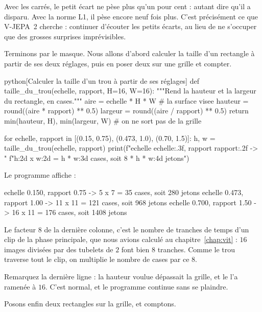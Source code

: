 Avec les carrés, le petit écart ne pèse plus qu'un pour cent : autant dire
qu'il a disparu. Avec la norme L1, il pèse encore neuf fois plus. C'est
précisément ce que V-JEPA~2 cherche : continuer d'écouter les petits écarts,
au lieu de ne s'occuper que des grosses surprises imprévisibles.

Terminons par le masque. Nous allons d'abord calculer la taille d'un
rectangle à partir de ses deux réglages, puis en poser deux sur une grille
et compter.

\begin{code}{python}[Calculer la taille d'un trou à partir de ses réglages]
def taille_du_trou(echelle, rapport, H=16, W=16):
    """Rend la hauteur et la largeur du rectangle, en cases."""
    aire = echelle * H * W                       # la surface visee
    hauteur = round((aire * rapport) ** 0.5)
    largeur = round((aire / rapport) ** 0.5)
    return min(hauteur, H), min(largeur, W)      # on ne sort pas de la grille

for echelle, rapport in [(0.15, 0.75), (0.473, 1.0), (0.70, 1.5)]:
    h, w = taille_du_trou(echelle, rapport)
    print(f"echelle {echelle:.3f}, rapport {rapport:.2f} -> "
          f"{h:2d} x {w:2d} = {h * w:3d} cases, soit {8 * h * w:4d} jetons")
\end{code}

Le programme affiche :

\begin{sortie}
echelle 0.150, rapport 0.75 ->  5 x  7 =  35 cases, soit  280 jetons
echelle 0.473, rapport 1.00 -> 11 x 11 = 121 cases, soit  968 jetons
echelle 0.700, rapport 1.50 -> 16 x 11 = 176 cases, soit 1408 jetons
\end{sortie}

Le facteur $8$ de la dernière colonne, c'est le nombre de tranches de temps
d'un clip de la phase principale, que nous avions calculé au
chapitre~\ref{chap:vit} : $16$ images divisées par des tubelets de $2$ font
bien $8$ tranches. Comme le trou traverse tout le clip, on multiplie le
nombre de cases par ce $8$.

Remarquez la dernière ligne : la hauteur voulue dépassait la grille, et le
 l'a ramenée à $16$. C'est normal, et le programme continue
sans se plaindre.

Posons enfin deux rectangles sur la grille, et comptons.

